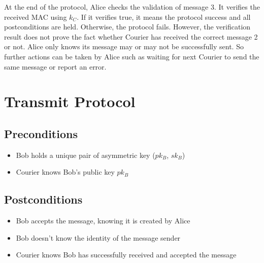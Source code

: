 At the end of the protocol, Alice checks the validation of message 3. It verifies the received MAC using $ k_C $. If it verifies true, it means the protocol success and all postconditions are held. Otherwise, the protocol fails. However, the verification result does not prove the fact whether Courier has received the correct message 2 or not. Alice only knows its message may or may not be successfully sent. So further actions can be taken by Alice such as waiting for next Courier to send the same message or report an error.


\pagebreak
\section{Transmit Protocol}
\subsection{Preconditions}
\begin{itemize}
\item Bob holds a unique pair of asymmetric key ($pk_B$, $sk_B$)
\item Courier knows Bob's public key $pk_B$
\end{itemize}
\subsection{Postconditions}
\begin{itemize}
\item Bob accepts the message, knowing it is created by Alice
\item Bob doesn't know the identity of the message sender
\item Courier knows Bob has successfully received and accepted the message
\end{itemize}
